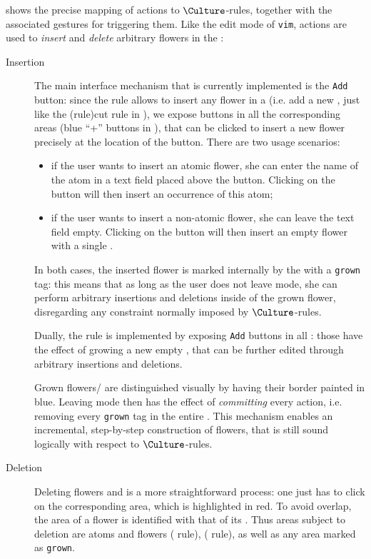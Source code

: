 \begin{scope}
 shows the precise mapping of \Edit actions to
$\Culture$-rules, together with the associated gestures for triggering them.
Like the edit mode of \texttt{vim}, \Edit actions are used to \emph{insert} and
\emph{delete} arbitrary flowers in the :
\begin{description}
  \item[Insertion] The main interface mechanism that is currently
  implemented is the \texttt{Add} button: since the  rule allows to
  insert any flower in a   (i.e. add a new , just like the
  \kl(rule){cut} rule in ), we expose buttons in all the corresponding
  areas (blue ``+'' buttons in ), that can be
  clicked to insert a new flower precisely at the location of the button. There
  are two usage scenarios:
  \begin{itemize}
    \item if the user wants to insert an atomic flower, she can enter the name
    of the atom in a text field placed above the button. Clicking on the button
    will then insert an occurrence of this atom;
    \item if the user wants to insert a non-atomic flower, she can leave the
    text field empty. Clicking on the button will then insert an empty flower
    with a single .
  \end{itemize}
  In both cases, the inserted flower is marked internally by the 
  with a \texttt{grown} tag: this means that as long as the user does not leave
  \Edit mode, she can perform arbitrary insertions and deletions inside of the
  grown flower, disregarding any  constraint normally imposed by
  $\Culture$-rules.
  
  Dually, the  rule is implemented by exposing \texttt{Add} buttons in
  all  : those have the effect of growing a new empty ,
  that can be further edited through arbitrary insertions and deletions.

  Grown flowers/ are distinguished visually by having their border painted
  in blue. Leaving \Edit mode then has the effect of \emph{committing} every
  \Edit action, i.e. removing every \texttt{grown} tag in the entire . This
  mechanism enables an incremental, step-by-step construction of flowers, that
  is still sound logically with respect to $\Culture$-rules.

  \item[Deletion] Deleting flowers and  is a more straightforward
  process: one just has to click on the corresponding area, which is highlighted
  in red. To avoid overlap, the area of a flower is identified with that of its
  . Thus areas subject to deletion are  atoms and flowers
  ( rule),   ( rule), as well as any area
  marked as \texttt{grown}.
\end{description}


\end{scope}
